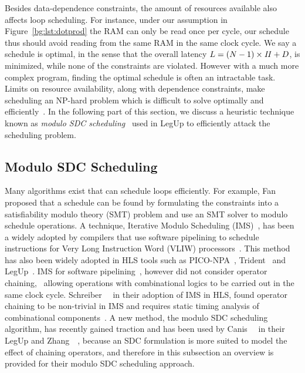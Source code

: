 Besides data-dependence constraints, the amount of resources available
also affects loop scheduling.  For instance, under our assumption in
Figure~\ref{bg:lst:dotprod} the RAM can only be read once per cycle, our
schedule thus should avoid reading from the same RAM in the same clock cycle.
We say a schedule is optimal, in the sense that the overall latency $L = (N -
1) \times \mathit{II} + D$, is minimized, while none of the constraints are violated.
However with a much more complex program, finding the optimal schedule is
often an intractable task.  Limits on resource availability, along with
dependence constraints, make scheduling an NP-hard problem which is difficult
to solve optimally and efficiently~\cite{hwang91}.  In the following part
of this section, we discuss a heuristic technique known as \emph{modulo SDC
scheduling}~\cite{zhang13, canis14} used in LegUp to efficiently attack the
scheduling problem.


\subsection{Modulo SDC Scheduling}
\label{bg:sub:sdc}

Many algorithms exist that can schedule loops efficiently.  For example,
Fan~\etal~\cite{fan08} proposed that a schedule can be found by formulating
the constraints into a satisfiability modulo theory (SMT) problem and use
an SMT solver to modulo schedule operations.  A technique, Iterative Modulo
Scheduling (IMS)~\cite{rau94}, has been a widely adopted by compilers that use
software pipelining to schedule instructions for Very Long Instruction Word
(VLIW) processors~\cite{mcnairy03}.  This method has also been widely adopted
in HLS tools such as PICO-NPA~\cite{schreiber02}, Trident~\cite{tripp05} and
LegUp~\cite{canis13, canis14}.  IMS for software pipelining~\cite{rau94},
however did not consider operator chaining, \ie~allowing operations
with combinational logics to be carried out in the same clock cycle.
Schreiber~\etal~\cite{schreiber02} in their adoption of IMS in HLS, found
operator chaining to be non-trivial in IMS and requires static timing analysis
of combinational components~\cite{canis14}.  A new method, the modulo SDC
scheduling algorithm, has recently gained traction and has been used by
Canis~\etal~\cite{canis14} in their LegUp and Zhang~\etal~\cite{zhang13},
because an SDC formulation is more suited to model the effect of chaining
operators, and therefore in this subsection an overview is provided for their
modulo SDC scheduling approach.

